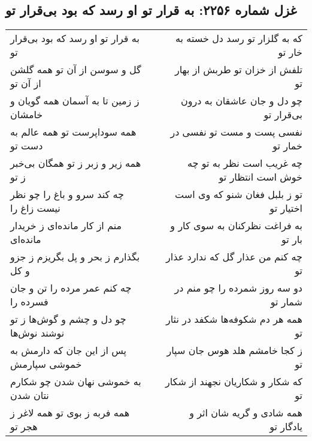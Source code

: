 \begin{center}
\section*{غزل شماره ۲۲۵۶: به قرار تو او رسد که بود بی‌قرار تو}
\label{sec:2256}
\begin{longtable}{l p{0.5cm} r}
به قرار تو او رسد که بود بی‌قرار تو
&&
که به گلزار تو رسد دل خسته به خار تو
\\
گل و سوسن از آن تو همه گلشن از آن تو
&&
تلفش از خزان تو طربش از بهار تو
\\
ز زمین تا به آسمان همه گویان و خامشان
&&
چو دل و جان عاشقان به درون بی‌قرار تو
\\
همه سوداپرست تو همه عالم به دست تو
&&
نفسی پست و مست تو نفسی در خمار تو
\\
همه زیر و زبر ز تو همگان بی‌خبر ز تو
&&
چه غریب است نظر به تو چه خوش است انتظار تو
\\
چه کند سرو و باغ را چو نظر نیست زاغ را
&&
تو ز بلبل فغان شنو که وی است اختیار تو
\\
منم از کار مانده‌ای ز خریدار مانده‌ای
&&
به فراغت نظرکنان به سوی کار و بار تو
\\
بگذارم ز بحر و پل بگریزم ز جزو و کل
&&
چه کنم من عذار گل که ندارد عذار تو
\\
چه کنم عمر مرده را تن و جان فسرده را
&&
دو سه روز شمرده را چو منم در شمار تو
\\
چو دل و چشم و گوش‌ها ز تو نوشند نوش‌ها
&&
همه هر دم شکوفه‌ها شکفد در نثار تو
\\
پس از این جان که دارمش به خموشی سپارمش
&&
ز کجا خامشم هلد هوس جان سپار تو
\\
به خموشی نهان شدن چو شکارم نتان شدن
&&
که شکار و شکاریان نجهند از شکار تو
\\
همه فربه ز بوی تو همه لاغر ز هجر تو
&&
همه شادی و گریه شان اثر و یادگار تو
\\
\end{longtable}
\end{center}
